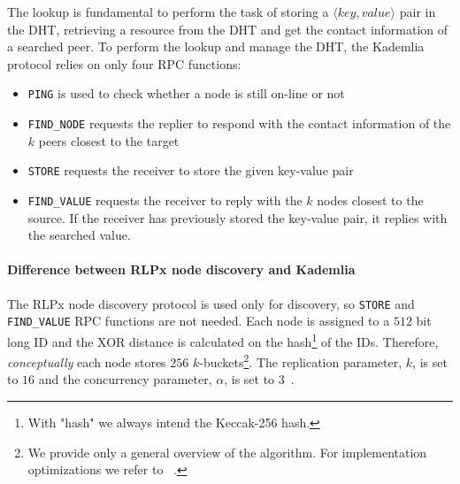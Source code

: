 The lookup is fundamental to perform the task of storing a $\langle key,
value\rangle$ pair in the DHT, retrieving a resource from the DHT and get the
contact information of a searched peer. To perform the lookup and manage the
DHT, the Kademlia protocol relies on only four RPC functions:
\begin{itemize}
    \item \verb|PING| is used to check whether a node is still on-line or not
    \item \verb|FIND_NODE| requests the replier to respond with the contact
    information of the $k$ peers closest to the target
    \item \verb|STORE| requests the receiver to store the given key-value pair
    \item \verb|FIND_VALUE| requests the receiver to reply with the $k$ nodes
    closest to the source. If the receiver has previously stored the key-value
    pair, it replies with the searched value.
\end{itemize}


\paragraph{Difference between RLPx node discovery and Kademlia}
\label{sec:rlpx-discovery}
The RLPx node discovery protocol is used only for discovery, so \verb|STORE| and
\verb|FIND_VALUE| RPC functions are not needed. Each node is assigned to a $512$
bit long ID and the XOR distance is calculated on the hash\footnote{With "hash"
we always intend the Keccak-256 hash.} of the IDs. Therefore,
\emph{conceptually} each node stores $256$ $k$-buckets\footnote{We provide only
a general overview of the algorithm. For implementation optimizations we refer
to ~\cite{bib:kademlia}.}. The replication parameter, $k$, is set to $16$ and
the concurrency parameter, $\alpha$, is set to
$3$~\cite{bib:rlpx-discovery-protocol}.

